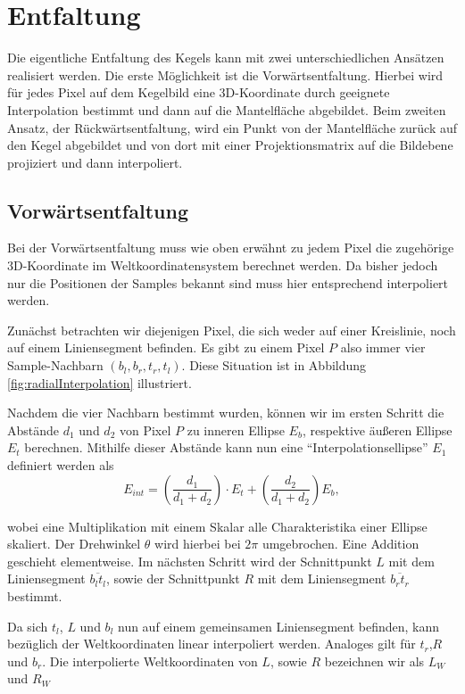 \section{Entfaltung}
\label{s:unfolding}
Die eigentliche Entfaltung des Kegels kann mit zwei unterschiedlichen Ansätzen realisiert werden.
Die erste Möglichkeit ist die Vorwärtsentfaltung. Hierbei wird für jedes Pixel auf dem Kegelbild eine 3D-Koordinate durch geeignete Interpolation bestimmt und dann auf die Mantelfläche abgebildet. Beim zweiten Ansatz, der Rückwärtsentfaltung, wird ein Punkt von der Mantelfläche zurück auf den Kegel abgebildet und von dort mit einer Projektionsmatrix auf die Bildebene projiziert und dann interpoliert.

\subsection{Vorwärtsentfaltung}
Bei der Vorwärtsentfaltung muss wie oben erwähnt zu jedem Pixel die zugehörige 3D-Koordinate im Weltkoordinatensystem berechnet werden. Da bisher jedoch nur die Positionen der Samples bekannt sind muss hier entsprechend interpoliert werden.

Zunächst betrachten wir diejenigen Pixel, die sich weder auf einer Kreislinie, noch auf einem Liniensegment befinden. Es gibt zu einem Pixel $P$ also immer vier Sample-Nachbarn $(b_l, b_r, t_r, t_l)$. Diese Situation ist in Abbildung \ref{fig:radialInterpolation} illustriert.

Nachdem die vier Nachbarn bestimmt wurden, können wir im ersten Schritt die Abstände $d_1$ und $d_2$ von Pixel $P$ zu inneren Ellipse $E_b$, respektive äußeren Ellipse $E_t$ berechnen. Mithilfe dieser Abstände kann nun eine "`Interpolationsellipse"' $E_1$ definiert werden als
\begin{equation*}
	E_{int} = \left(\frac{d_1}{d_1 + d_2}\right) \cdot E_t + \left(\frac{d_2}{d_1 + d_2}\right) E_b,
\end{equation*}

wobei eine Multiplikation mit einem Skalar alle Charakteristika einer Ellipse skaliert. Der Drehwinkel $\theta$ wird hierbei bei $2\pi$ umgebrochen. Eine Addition geschieht elementweise. Im nächsten Schritt wird der Schnittpunkt $L$ mit dem Liniensegment $\overline{b_lt_l}$, sowie der Schnittpunkt $R$ mit dem Liniensegment $\overline{b_rt_r}$ bestimmt.

Da sich $t_l$, $L$ und $b_l$ nun auf einem gemeinsamen Liniensegment befinden, kann bezüglich der Weltkoordinaten linear interpoliert werden. Analoges gilt für $t_r$,$R$ und $b_r$.
Die interpolierte Weltkoordinaten von $L$, sowie $R$ bezeichnen wir als $L_W$ und $R_W$

